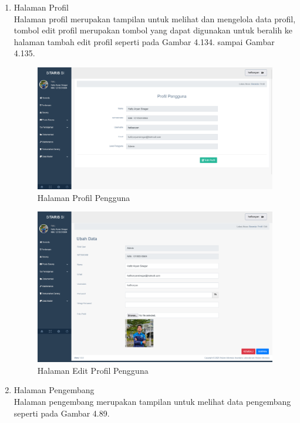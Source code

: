 \begin{enumerate}
  \item Halaman Profil \\ Halaman profil merupakan tampilan untuk melihat dan mengelola data profil, tombol edit profil merupakan tombol yang dapat digunakan untuk beralih ke halaman tambah edit profil seperti pada Gambar 4.134. sampai Gambar 4.135.

        \begin{figure}
          \centering
          \includegraphics[width=0.82\linewidth]{konten//gambar/profil.png}
          \caption{Halaman Profil Pengguna}
          \label{fig:enter-label}
        \end{figure}

        \begin{figure}
          \centering
          \includegraphics[width=0.82\linewidth]{konten//gambar/profil edit.png}
          \caption{Halaman Edit Profil Pengguna}
          \label{fig:enter-label}
        \end{figure}

  \item Halaman Pengembang \\ Halaman pengembang merupakan tampilan untuk melihat data pengembang seperti pada Gambar 4.89.


\end{enumerate}
